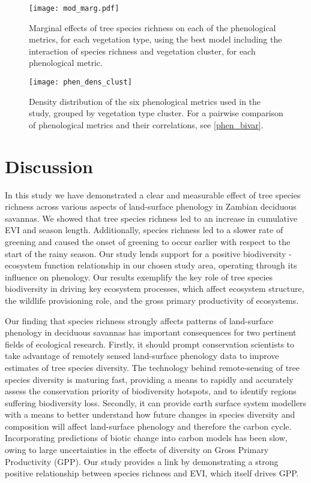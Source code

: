 \documentclass[11pt,a4paper]{article}
\begin{document}
\begin{figure}[H]
\centering
	\texttt{[image: mod\_marg.pdf]}
	\caption{Marginal effects of tree species richness on each of the phenological metrics, for each vegetation type, using the best model including the interaction of species richness and vegetation cluster, for each phenological metric.}
	\label{mod_marg}
\end{figure}

\begin{figure}[H]
\centering
	\texttt{[image: phen\_dens\_clust]}
	\caption{Density distribution of the six phenological metrics used in the study, grouped by vegetation type cluster. For a pairwise comparison of phenological metrics and their correlations, see \autoref{phen_bivar}.}
	\label{phen_dens_clust}
\end{figure}

\section{Discussion}

In this study we have demonstrated a clear and measurable effect of tree species richness across various aspects of land-surface phenology in Zambian deciduous savannas. We showed that tree species richness led to an increase in cumulative EVI and season length. Additionally, species richness led to a slower rate of greening and caused the onset of greening to occur earlier with respect to the start of the rainy season. Our study lends support for a positive biodiversity - ecosystem function relationship in our chosen study area, operating through its influence on phenology. Our results exemplify the key role of tree species biodiversity in driving key ecosystem processes, which affect ecosystem structure, the wildlife provisioning role, and the gross primary productivity of ecosystems.

Our finding that species richness strongly affects patterns of land-surface phenology in deciduous savannas has important consequences for two pertinent fields of ecological research. Firstly, it should prompt conservation scientists to take advantage of remotely sensed land-surface phenology data to improve estimates of tree species diversity. The technology behind remote-sensing of tree species diversity is maturing fast, providing a means to rapidly and accurately assess the conservation priority of biodiversity hotspots, and to identify regions suffering biodiversity loss. Secondly, it can provide earth surface system modellers with a means to better understand how future changes in species diversity and composition will affect land-surface phenology and therefore the carbon cycle. Incorporating predictions of biotic change into carbon models has been slow, owing to large uncertainties in the effects of diversity on Gross Primary Productivity (GPP). Our study provides a link by demonstrating a strong positive relationship between species richness and EVI, which itself drives GPP.
\end{document}
